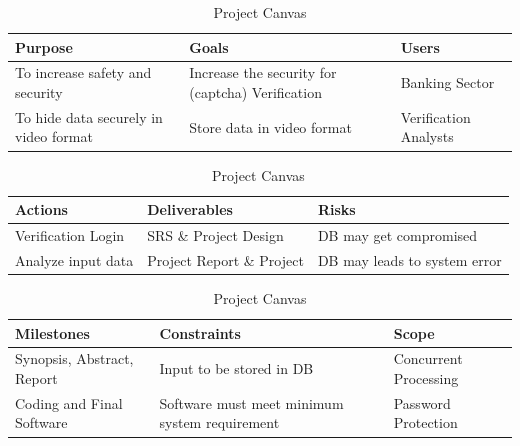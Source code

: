 \begin{table}[ht]
\caption{Project Canvas}
\begin{tabular}{ |p{5cm}|p{5cm}|p{5cm}|  }
 \hline
 \textbf{Purpose} & \textbf{Goals} & \textbf{Users}\\
 \hline
To increase safety and security & Increase the security for (captcha) Verification & Banking Sector\\

To hide data securely in video format & Store data  in video format & Verification Analysts\\
 \hline
 \end{tabular}
 \vspace{0.5cm} 
 
\begin{tabular}{ |p{5cm}|p{5cm}|p{5cm}|  }
 \hline
 \textbf{Actions} & \textbf{Deliverables} & \textbf{Risks} \\
 \hline
 Verification Login  & SRS  \& Project Design & DB may get compromised\\


  Analyze input data & Project Report \& Project & DB may leads to system error\\
   \hline
 
 \end{tabular}
 
\vspace{0.5cm} 

 \begin{tabular}{ |p{5cm}|p{5cm}|p{5cm}|  }
 \hline
 \textbf{Milestones} & \textbf{Constraints} & \textbf{Scope} \\
 \hline
 Synopsis, Abstract, Report & Input to be stored in DB & Concurrent Processing\\

  Coding and Final Software & Software must meet minimum system requirement & Password Protection \\ 
   \hline
 
 \end{tabular}

\end{table} \\\\
\pagebreak
\newpage
\noindent\\\\
\\\\
\\\\
\\\\
\\\\
\\\\
\\\\
\\\\
\\\\
\\\\
\\\\
 \newpage
